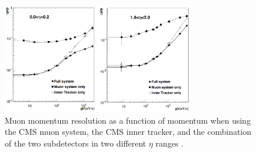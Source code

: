 \begin{figure}
\centering
\includegraphics[width=0.75\textwidth]{figures/lhc_and_cms/muon_momentum_resolution.png}
\caption{Muon momentum resolution as a function of momentum when using the CMS muon system, the CMS inner tracker, and the combination of the two subdetectors in two different $\eta$ ranges \cite{cms_tdr_v1}.}
\label{muon_momentum_resolution}
\end{figure}